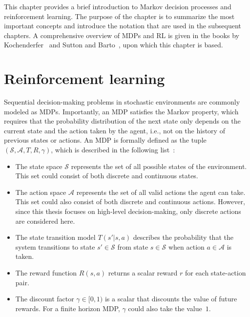 This chapter provides a brief introduction to Markov decision processes and reinforcement learning.
The purpose of the chapter is to summarize the most important concepts and introduce the notation that are used in the subsequent chapters. 
A comprehensive overview of MDPs and RL is given in the books by Kochenderfer~\cite{Kochenderfer2015} and Sutton and Barto~\cite{Sutton2018}, upon which this chapter is based.

\section{Reinforcement learning}



Sequential decision-making problems in stochastic environments are commonly modeled as MDPs. Importantly, an MDP satisfies the Markov property, which requires that the probability distribution of the next state only depends on the current state and the action taken by the agent, i.e., not on the history of previous states or actions. An MDP is formally defined as the tuple $( \mathcal{S}, \mathcal{A}, T, R, \gamma )$, which is described in the following list~\cite[Ch. 4]{Kochenderfer2015}:
%
\begin{itemize}
    \item The state space $\mathcal{S}$ represents the set of all possible states of the environment. This set could consist of both discrete and continuous states.
    \item The action space $\mathcal{A}$ represents the set of all valid actions the agent can take. This set could also consist of both discrete and continuous actions. However, since this thesis focuses on high-level decision-making, only discrete actions are considered here.
    \item The state transition model $T(s'|s,a)$ describes the probability that the system transitions to state $s' \in \mathcal{S}$ from state $s \in \mathcal{S}$ when action $a \in \mathcal{A}$ is taken.
    \item The reward function $R(s,a)$ returns a scalar reward $r$ for each state-action pair.
    \item The discount factor $\gamma \in [0,1)$ is a scalar that discounts the value of future rewards. For a finite horizon MDP, $\gamma$ could also take the value~$1$.
\end{itemize}

